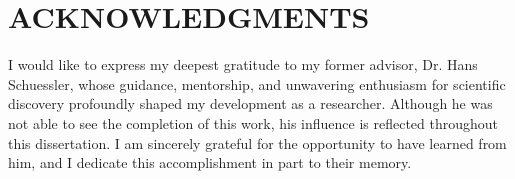 %
%
%
%
%


\chapter*{ACKNOWLEDGMENTS}


\indent I would like to express my deepest gratitude to my former advisor, Dr. Hans Schuessler, whose guidance, mentorship, and unwavering enthusiasm for scientific discovery profoundly shaped my development as a researcher. Although he was not able to see the completion of this work, his influence is reflected throughout this dissertation. I am sincerely grateful for the opportunity to have learned from him, and I dedicate this accomplishment in part to their memory.

\pagebreak{}